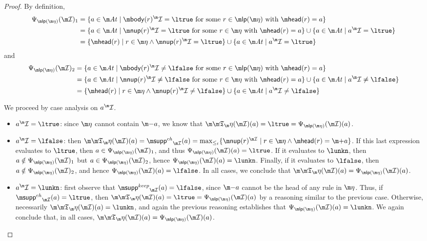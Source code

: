 \begin{proof}
  By definition,
  \begin{align*}
    \Psi_{\lpop(\aics)}(\pstruct)_1 &= \{a\in\atoms \mid \body(r)^\pstruct=\ltrue \mbox{ for some $r\in\lpop(\aics)$ with $\head(r)=a$}\} \\
    &= \{a\in\atoms \mid \nup(r)^\pstruct=\ltrue \mbox{ for some $r\in\aics$ with $\head(r)=a$}\}\cup\{a\in\atoms\mid a^\pstruct=\ltrue\} \\
    &= \{\head(r) \mid r\in\aics\land\nup(r)^\pstruct=\ltrue\}\cup\{a\in\atoms\mid a^\pstruct=\ltrue\}
  \end{align*}
  and
  \begin{align*}
    \Psi_{\lpop(\aics)}(\pstruct)_2 &= \{a\in\atoms \mid \body(r)^\pstruct\neq\lfalse \mbox{ for some $r\in\lpop(\aics)$ with $\head(r)=a$}\} \\
    &= \{a\in\atoms \mid \nup(r)^\pstruct\neq\lfalse \mbox{ for some $r\in\aics$ with $\head(r)=a$}\}\cup\{a\in\atoms\mid a^\pstruct\neq\lfalse\} \\
    &= \{\head(r) \mid r\in\aics\land\nup(r)^\pstruct\neq\lfalse\}\cup\{a\in\atoms\mid a^\pstruct\neq\lfalse\}
  \end{align*}

  We proceed by case analysis on $a^\pstruct$.
  \begin{itemize}
  \item $a^\pstruct=\ltrue$: since $\aics$ cannot contain $\remove a$, we know that $\Ap(\pstruct)(a)=\ltrue=\Psi_{\lpop(\aics)}(\pstruct)(a)$.
  \item $a^\pstruct=\lfalse$: then $\Ap(\pstruct)(a)=\suppin_{\pstruct}(a)=\max_{\leq_t}\{\nup(r)^{\pstruct}\mid r\in \aics \land \head(r) =\add a\}$.
    If this last expression evaluates to $\ltrue$, then $a\in\Psi_{\lpop(\aics)}(\pstruct)_1$, and thus $\Psi_{\lpop(\aics)}(\pstruct)(a)=\ltrue$.
    If it evaluates to $\lunkn$, then $a\notin\Psi_{\lpop(\aics)}(\pstruct)_1$ but $a\in\Psi_{\lpop(\aics)}(\pstruct)_2$, hence $\Psi_{\lpop(\aics)}(\pstruct)(a)=\lunkn$.
    Finally, if it evaluates to $\lfalse$, then $a\notin\Psi_{\lpop(\aics)}(\pstruct)_2$, and hence $\Psi_{\lpop(\aics)}(\pstruct)(a)=\lfalse$.
    In all cases, we conclude that $\Ap(\pstruct)(a)=\Psi_{\lpop(\aics)}(\pstruct)(a)$.
  \item $a^\pstruct=\lunkn$: first observe that $\suppout_{\pstruct}(a)=\lfalse$, since $\remove a$ cannot be the head of any rule in $\aics$.
    Thus, if $\suppin_{\pstruct}(a)=\ltrue$, then $\Ap(\pstruct)(a)=\ltrue=\Psi_{\lpop(\aics)}(\pstruct)(a)$ by a reasoning similar to the previous case.
    Otherwise, necessarily $\Ap(\pstruct)(a)=\lunkn$, and again the previous reasoning establishes that $\Psi_{\lpop(\aics)}(\pstruct)(a)=\lunkn$.
    We again conclude that, in all cases, $\Ap(\pstruct)(a)=\Psi_{\lpop(\aics)}(\pstruct)(a)$.
  \end{itemize}

\end{proof}

